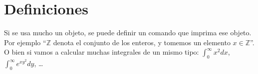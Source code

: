 \chapter{Definiciones}

\newcommand{\Z}{{\mathbb Z}}
\newcommand{\f}[2]{{\int_0^\infty #1 d #2}}

Si se usa mucho un objeto, se puede definir un comando que imprima ese objeto. Por ejemplo ``$\Z$ denota el conjunto de los enteros, y tomemos un elemento $x\in \Z$''. O bien si vamos a calcular muchas integrales de un mismo tipo: $\f{x^2}{x}$, $\f{e^{xy^2}}{y}$, \ldots
